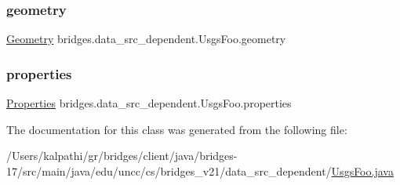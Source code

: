 \subsubsection{\texorpdfstring{geometry}{geometry}}
{\footnotesize\ttfamily \mbox{\hyperlink{classbridges_1_1data__src__dependent_1_1_usgs_foo_1_1_geometry}{Geometry}} bridges.\+data\+\_\+src\+\_\+dependent.\+Usgs\+Foo.\+geometry}

\mbox{\label{classbridges_1_1data__src__dependent_1_1_usgs_foo_a030d83e136f146824b5bda34a4c6fd1c}} 
\subsubsection{\texorpdfstring{properties}{properties}}
{\footnotesize\ttfamily \mbox{\hyperlink{classbridges_1_1data__src__dependent_1_1_usgs_foo_1_1_properties}{Properties}} bridges.\+data\+\_\+src\+\_\+dependent.\+Usgs\+Foo.\+properties}



The documentation for this class was generated from the following file\+:\begin{DoxyCompactItemize}
\item 
/\+Users/kalpathi/gr/bridges/client/java/bridges-\/17/src/main/java/edu/uncc/cs/bridges\+\_\+v21/data\+\_\+src\+\_\+dependent/\mbox{\hyperlink{_usgs_foo_8java}{Usgs\+Foo.\+java}}\end{DoxyCompactItemize}
